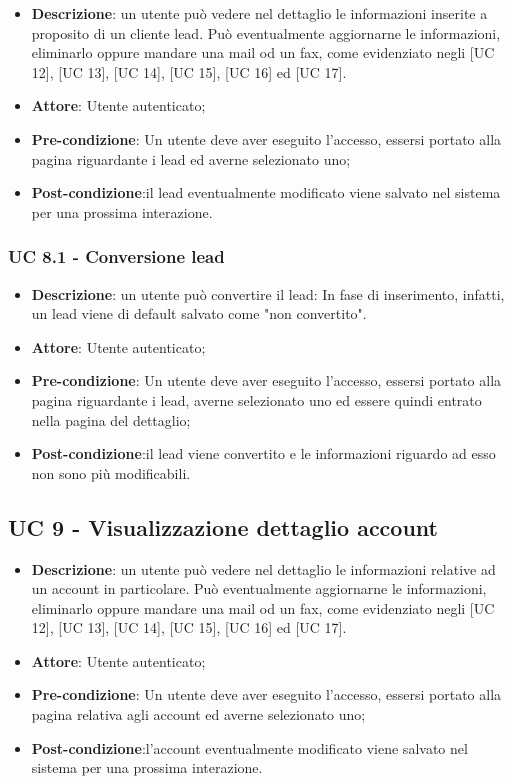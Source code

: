 \begin{itemize}
	\item \textbf{Descrizione}: un utente può vedere nel dettaglio le informazioni inserite a proposito di un cliente lead. Può eventualmente aggiornarne le informazioni, eliminarlo oppure mandare una mail od un fax, come evidenziato negli [UC 12], [UC 13], [UC 14], [UC 15], [UC 16] ed [UC 17].\\
	\item \textbf{Attore}: Utente autenticato;
	\item \textbf{Pre-condizione}: Un utente deve aver eseguito l'accesso, essersi portato alla pagina riguardante i lead ed averne selezionato uno;
	\item \textbf{Post-condizione}:il lead eventualmente modificato viene salvato nel sistema per una prossima interazione.
\end{itemize}

\subsubsection{UC 8.1 - Conversione lead} %

\begin{itemize}
	\item \textbf{Descrizione}: un utente può convertire il lead: In fase di inserimento, infatti, un lead viene di default salvato come "non convertito".
	\item \textbf{Attore}: Utente autenticato;
	\item \textbf{Pre-condizione}: Un utente deve aver eseguito l'accesso, essersi portato alla pagina riguardante i lead, averne selezionato uno ed essere quindi entrato nella pagina del dettaglio;
	\item \textbf{Post-condizione}:il lead viene convertito e le informazioni riguardo ad esso non sono più modificabili.
\end{itemize}

\subsection{UC 9 - Visualizzazione dettaglio account}

\begin{itemize}
	\item \textbf{Descrizione}: un utente può vedere nel dettaglio le informazioni relative ad un account in particolare. Può eventualmente aggiornarne le informazioni, eliminarlo oppure mandare una mail od un fax, come evidenziato negli [UC 12], [UC 13], [UC 14], [UC 15], [UC 16] ed [UC 17].\\
	\item \textbf{Attore}: Utente autenticato;
	\item \textbf{Pre-condizione}: Un utente deve aver eseguito l'accesso, essersi portato alla pagina relativa agli account ed averne selezionato uno;
	\item \textbf{Post-condizione}:l'account eventualmente modificato viene salvato nel sistema per una prossima interazione.
\end{itemize}


